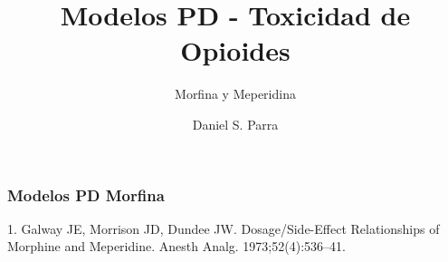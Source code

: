 \documentclass[10pt]{beamer}
\begin{document}
	\author{Daniel S. Parra}
	\title{Modelos PD - Toxicidad de Opioides}
	\subtitle{Morfina y Meperidina}
	\begin{frame}[plain]
		\maketitle
	\end{frame}
	
	\begin{frame}
		\frametitle{Modelos PD Morfina}
		1. Galway JE, Morrison JD, Dundee JW. Dosage/Side-Effect Relationships of Morphine and Meperidine. Anesth Analg. 1973;52(4):536–41. 
	\end{frame}
	
\end{document}
